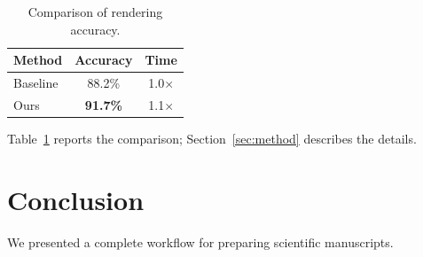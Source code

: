\documentclass[11pt]{article}
\begin{document}
\begin{table}[htbp]
  \centering
  \caption{Comparison of rendering accuracy.}
  \label{tab:result}
  \begin{tabular}{lcc}
    \toprule
    Method & Accuracy & Time \\
    \midrule
    Baseline & 88.2\% & 1.0$\times$ \\
    Ours     & \textbf{91.7\%} & 1.1$\times$ \\
    \bottomrule
  \end{tabular}
\end{table}

Table~\ref{tab:result} reports the comparison; Section~\ref{sec:method}
describes the details.

\section{Conclusion}
\label{sec:conclusion}

We presented a complete workflow for preparing scientific manuscripts.



\end{document}
